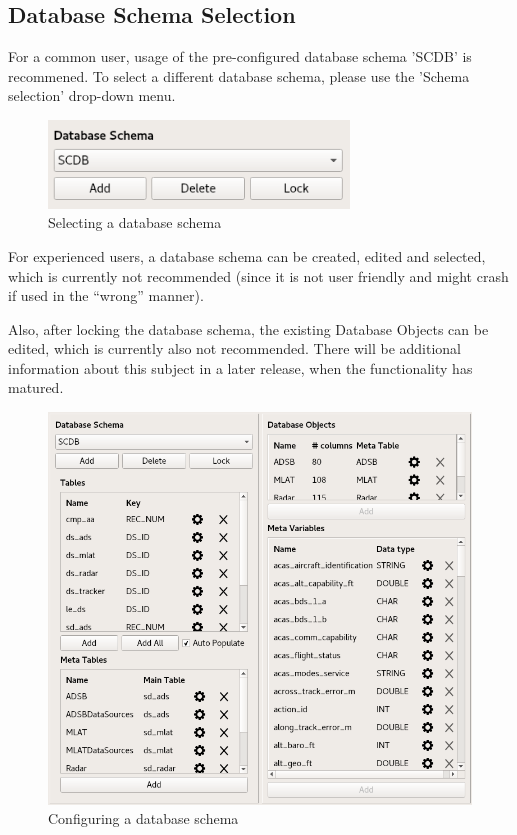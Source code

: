 \subsection{Database Schema Selection}
For a common user, usage of the pre-configured database schema 'SCDB' is recommened. To select a different database schema, please use the 'Schema selection' drop-down menu.\\

\begin{figure}[H]
  \center
    \includegraphics[width=8cm,frame]{../screenshots/database_schema_selection.png}
  \caption{Selecting a database schema}
  \label{fig:db_schema_select}
\end{figure}

For experienced users, a database schema can be created, edited and selected, which is currently not recommended (since it is not user friendly and might crash if used in the ``wrong'' manner).

Also, after locking the database schema, the existing Database Objects can be edited, which is currently also not recommended. There will be additional information about this subject in a later release, when the functionality has matured.

\begin{figure}[H]
  \hspace*{-1cm}
    \includegraphics[width=16cm,frame]{../screenshots/database_schema_configuration.png}
  \caption{Configuring a database schema}
  \label{fig:db_schema_configuration}
\end{figure}

